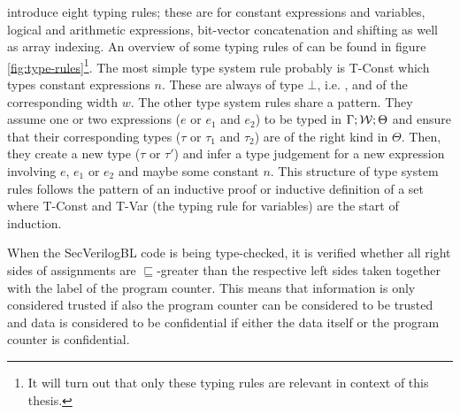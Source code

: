 \citeauthor{Ferraiuolo17} introduce eight typing rules; these are for constant expressions and variables, logical and arithmetic expressions, bit-vector concatenation and shifting as well as array indexing.
An overview of some typing rules of \cite{Ferraiuolo17} can be found in figure \ref{fig:type-rules}\footnote{%
    It will turn out that only these typing rules are relevant in context of this thesis.
}.
The most simple type system rule probably is T-Const which types constant expressions $ n $.
These are always of type $ \bot $, i.e. \PT, and of the corresponding width $ w $.
The other type system rules share a pattern.
They assume one or two expressions ($ e $ or $ e_1 $ and $ e_2 $) to be typed in $ \Gamma; \mathcal{W}; \Theta $ and ensure that their corresponding types ($ \tau $ or $ \tau_1 $ and $ \tau_2 $) are of the right kind in $ \Theta $.
Then, they create a new type ($ \tau $ or $ \tau' $) and infer a type judgement for a new expression involving $ e $, $ e_1 $ or $ e_2 $ and maybe some constant $ n $.
This structure of type system rules follows the pattern of an inductive proof or inductive definition of a set where T-Const and T-Var (the typing rule for variables) are the start of induction.

When the SecVerilogBL code is being type-checked, it is verified whether all right sides of assignments are $ \sqsubseteq $-greater than the respective left sides taken together with the label of the program counter.
This means that information is only considered trusted if also the program counter can be considered to be trusted and data is considered to be confidential if either the data itself or the program counter is confidential.

